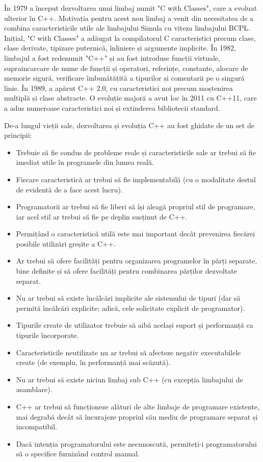 \documentclass[a4paper,12pt]{report}
\begin{document}
În 1979 a început dezvoltarea unui limbaj numit "C with Classes", care a evoluat ulterior în C++. Motivația pentru acest nou limbaj a venit din necesitatea de a combina caracteristicile utile ale limbajului Simula cu viteza limbajului BCPL. Inițial, "C with Classes" a adăugat la compilatorul C caracteristici precum clase, clase derivate, tipizare puternică, înliniere și argumente implicite. În 1982, limbajul a fost redenumit "C++" și au fost introduse funcții virtuale, supraincarcare de nume de funcții și operatori, referințe, constante, alocare de memorie sigură, verificare îmbunătățită a tipurilor și comentarii pe o singură linie. În 1989, a apărut C++ 2.0, cu caracteristici noi precum moștenirea multiplă și clase abstracte. O evoluție majoră a avut loc în 2011 cu C++11, care a adus numeroase caracteristici noi și extinderea bibliotecii standard.

De-a lungul vieții sale, dezvoltarea și evoluția C++ au fost ghidate de un set de principii:
\begin{itemize}
    \item Trebuie să fie condus de probleme reale și caracteristicile sale ar trebui să fie imediat utile în programele din lumea reală.
    \item Fiecare caracteristică ar trebui să fie implementabilă (cu o modalitate destul de evidentă de a face acest lucru).
    \item Programatorii ar trebui să fie liberi să își aleagă propriul stil de programare, iar acel stil ar trebui să fie pe deplin susținut de C++.
    \item Permițând o caracteristică utilă este mai important decât prevenirea fiecărei posibile utilizări greșite a C++.
    \item Ar trebui să ofere facilități pentru organizarea programelor în părți separate, bine definite și să ofere facilități pentru combinarea părților dezvoltate separat.
    \item Nu ar trebui să existe încălcări implicite ale sistemului de tipuri (dar să permită încălcări explicite; adică, cele solicitate explicit de programator).
    \item Tipurile create de utilizator trebuie să aibă același suport și performanță ca tipurile încorporate.
    \item Caracteristicile neutilizate nu ar trebui să afecteze negativ executabilele create (de exemplu, în performanță mai scăzută).
    \item Nu ar trebui să existe niciun limbaj sub C++ (cu excepția limbajului de asamblare).
    \item C++ ar trebui să funcționeze alături de alte limbaje de programare existente, mai degrabă decât să încurajeze propriul său mediu de programare separat și incompatibil.
    \item Dacă intenția programatorului este necunoscută, permiteți-i programatorului să o specifice furnizând control manual.
\end{itemize}
\end{document}
